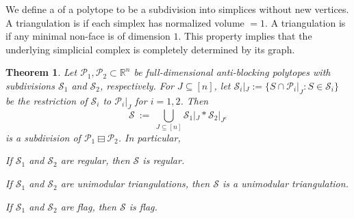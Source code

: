 \documentclass[11pt]{amsart}
\newtheorem{thm}{Theorem}[section]
\theoremstyle{definition}
\begin{document}
We define a {\textbf{\color{black}{triangulation}}} of a polytope to be a subdivision into
simplices without new vertices. A triangulation is {\textbf{\color{black}{unimodular}}} if each
simplex has normalized volume $=1$. A triangulation is {\textbf{\color{black}{flag}}} if any
minimal non-face is of dimension $1$. This property implies that the
underlying simplicial complex is completely determined by its graph.

\begin{thm}\label{thm:AB_subdiv}
    Let ${\mathcal{P}}_1,{\mathcal{P}}_2 \subset {\mathbb{R}}^n$ be full-dimensional anti-blocking
    polytopes with subdivisions ${\mathcal{S}}_1$ and ${\mathcal{S}}_2$, respectively. For
    $J \subseteq [n]$, let ${\mathcal{S}}_i|_J := \{ S \cap {\mathcal{P}}_i|_J : S \in
    {\mathcal{S}}_i \}$ be the restriction of ${\mathcal{S}}_i$ to ${\mathcal{P}}_i|_J$ for $i=1,2$.
    Then
    \[
        {\mathcal{S}} \ := \ \bigcup_{J \subseteq [n]} {\mathcal{S}}_1|_J * {\mathcal{S}}_2|_{J^c}
    \]
    is a subdivision of ${{{{\mathcal{P}}_1} \boxminus {{\mathcal{P}}_2}}}$. In particular,
    \begin{compactenum}[\rm (i)]
        \item If ${\mathcal{S}}_1$ and ${\mathcal{S}}_2$ are regular, then ${\mathcal{S}}$ is
            regular.
        \item If ${\mathcal{S}}_1$ and ${\mathcal{S}}_2$  are unimodular triangulations,
            then ${\mathcal{S}}$ is
            a unimodular triangulation. 
        \item If ${\mathcal{S}}_1$ and ${\mathcal{S}}_2$ are flag, then ${\mathcal{S}}$ is flag.
    \end{compactenum}
\end{thm}
\end{document}
